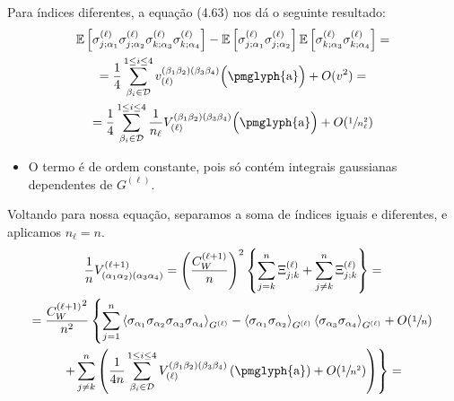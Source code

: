 \documentclass{beamer}
\newcommand{\EE}{\mathbb{E}}
\newcommand{\Dcal}{\mathcal{D}}
\def\mi#1{{\alpha_{#1}}}
\def\mj#1{\beta_{#1}}
\def\eell{{(\ell)}}
\def\eellum{{(\ell+1)}}
\newcommand{\Vertice}[5]{V^{(#1)}_{(\mi#2\mi#3)(\mi#4\mi#5)}}
\newcommand{\Verticeinvb}[5]{V_{(#1)}^{(\mj#2\mj#3)(\mj#4\mj#5)}}
\newcommand{\Expectation}[2]{\left\langle #1 \right\rangle_{#2}}
\begin{document}
\begin{frame}
	Para índices diferentes, a equação (4.63) nos dá o seguinte resultado:
	{\small
	\begin{multline*}
		\EE\left[\sigma_{j;\mi1}^\eell\sigma_{j;\mi2}^\eell \sigma_{k;\mi3}^\eell\sigma_{k;\mi4}^\eell\right] - \EE\left[\sigma_{j;\mi1}^\eell\sigma_{j;\mi2}^\eell\right]\EE\left[\sigma_{k;\mi3}^\eell\sigma_{k;\mi4}^\eell\right] = \\ =
		\frac{1}{4}\sum_{\mj{i}\in\Dcal}^{1\le{i}\le4}v^{(\mj1\mj2)(\mj3\mj4)}_{\eell}\Big(\text{\pmglyph{a}}\Big)  + O(v^2) =\\
		= \frac{1}{4}\sum_{\mj{i}\in\Dcal}^{1\le{i}\le4} \frac{1}{n_\ell}{\Verticeinvb{\ell}1234} \Big(\text{\pmglyph{a}}\Big)  + O(\sfrac{1}{n_\ell^2}) 
	\end{multline*}
	}
	\begin{itemize} 
		\item O termo  é de ordem constante, pois só contém integrais gaussianas dependentes de $G^\eell$.
	\end{itemize}
\end{frame}

\begin{frame}
	Voltando para nossa equação, separamos a soma de índices iguais e diferentes, e aplicamos $n_\ell = n$.
	\small
	\begin{multline*}
		\frac{1}{n}\Vertice{\ell+1}1234 =  \left(\frac{C_W^\eellum}{n}\right)^2 \left\{\sum_{j=k}^{n}\Xi_{j;k}^\eell + \sum_{j\neq k}^{n}\Xi_{j;k}^\eell\right\} = \\
		= \frac{{C_W^\eellum}^2}{n^2} \left\{\sum_{j=1}^{n}\Expectation{\sigma_\mi1\sigma_\mi2\sigma_\mi3\sigma_\mi4}{G^\eell} - \Expectation{\sigma_\mi1\sigma_\mi2}{G^\eell}  \Expectation{\sigma_\mi3\sigma_\mi4}{G^\eell}  +  O(\sfrac{1}{n}) \right.\\ 
		\left. +\sum_{j\neq k}^{n}\left(\frac{1}{4n}\sum_{\mj{i}\in\Dcal}^{1\le{i}\le4}\Verticeinvb{\ell}1234\left(\text{\pmglyph{a}}\right) + O(\sfrac{1}{n^2})\right)\right\} =
	\end{multline*}
\end{frame}
\end{document}
